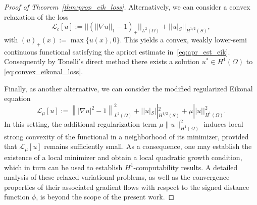 \documentclass[pdflatex]{sn-jnl}%
\newtheorem{proposition}[theorem]{Proposition}%
\begin{document}
\begin{proof}[Proof of Theorem~\ref{thm:prop_eik_loss}]
Alternatively, we can consider a convex relaxation of the loss
\begin{equation}\label{eq:convex_eikonal_loss}
    \mathcal{L}_c[u]:=||\left(||\nabla u||_1-1\right)_+||_{L^2(\Omega)}+||u|_S||_{H^{1/2}(S)},
\end{equation}
with $(u)_+(x):=\max\{u(x),0\}$. This yields a convex, weakly lower-semi continuous functional satisfying the apriori estimate in~\eqref{eq:apr_est_eik}. Consequently by Tonelli's direct method there exists a solution $u^*\in H^1(\Omega)$ to \eqref{eq:convex_eikonal_loss}. 

Finally, as another alternative, we can consider the modified regularized Eikonal equation 
\begin{equation}\label{eq:visc_eik}
\mathcal{L}_\mu[u]:=\left\||\nabla u|^2-1 \right\|_{L^2(\Omega)}^2 + ||u|_S||_{H^{1/2}(S)}^2+\mu ||u||_{H^1(\Omega)}^2.
\end{equation}
In this setting, the additional regularization term $\mu\| u\|_{H^1(\Omega)}^2$
induces local strong convexity of the functional in a neighborhood of its minimizer,
provided that $\mathcal{L}_\mu[u]$ remains sufficiently small.
As a consequence, one may establish the existence of a local minimizer and obtain a
local quadratic growth condition, which in turn can be used to establish $H^1$-computability results.
A detailed analysis of these relaxed variational problems, as well as the convergence
properties of their associated gradient flows with respect to the signed distance function $\phi$,
is beyond the scope of the present work.
\end{proof}
\end{document}
